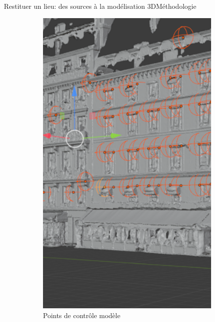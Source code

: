 \documentclass[8pt]{beamer}
\begin{document}
\begin{frame}{Restituer un lieu: des sources à la modélisation 3D}{Méthodologie}
\begin{figure}
\begin{subfigure}{0.23\textwidth}
			\includegraphics[width=\textwidth]{includes/c_slide9_1.png}
			\caption{Points de contrôle modèle}
		\end{subfigure}
		\begin{subfigure}{0.25\textwidth}

\end{subfigure}
\end{figure}
\end{frame}
\end{document}
